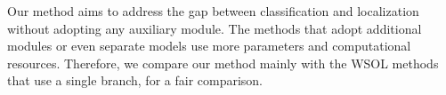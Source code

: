 Our method aims to address the gap between classification and localization without adopting any auxiliary module. The methods that adopt additional modules or even separate models use more parameters and computational resources.  Therefore, we compare our method mainly with the WSOL methods that use a single branch, for a fair comparison.